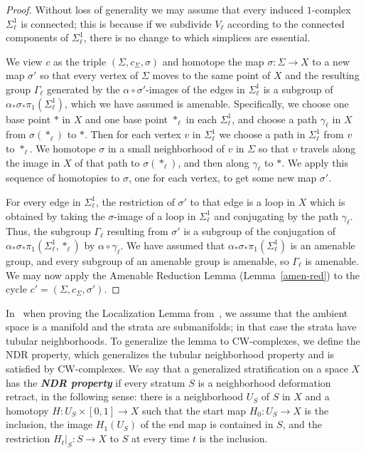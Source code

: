 \documentclass[psamsfonts]{amsart}
\theoremstyle{remark}
\begin{document}
\begin{proof}
Without loss of generality we may assume that every induced $1$-complex $\Sigma_\ell^1$ is connected; this is because if we subdivide $V_\ell$ according to the connected components of $\Sigma_\ell^1$, there is no change to which simplices are essential.  

We view $c$ as the triple $(\Sigma, c_\Sigma, \sigma)$ and homotope the map $\sigma : \Sigma \rightarrow X$ to a new map $\sigma'$ so that every vertex of $\Sigma$ moves to the same point of $X$ and the resulting group $\Gamma_\ell$ generated by the $\alpha \circ \sigma'$-images of the edges in $\Sigma_\ell^1$ is a subgroup of $\alpha_*\sigma_*\pi_1(\Sigma_\ell^1)$, which we have assumed is amenable.  Specifically, we choose one base point $*$ in $X$ and one base point $*_\ell$ in each $\Sigma_\ell^1$, and choose a path $\gamma_\ell$ in $X$ from $\sigma(*_\ell)$ to $*$.  Then for each vertex $v$ in $\Sigma_\ell^1$ we choose a path in $\Sigma_\ell^1$ from $v$ to $*_\ell$.  We homotope $\sigma$ in a small neighborhood of $v$ in $\Sigma$ so that $v$ travels along the image in $X$ of that path to $\sigma(*_\ell)$, and then along $\gamma_\ell$ to $*$.  We apply this sequence of homotopies to $\sigma$, one for each vertex, to get some new map $\sigma'$.

For every edge in $\Sigma_\ell^1$, the restriction of $\sigma'$ to that edge is a loop in $X$ which is obtained by taking the $\sigma$-image of a loop in $\Sigma_\ell^1$ and conjugating by the path $\gamma_\ell$.  Thus, the subgroup $\Gamma_\ell$ resulting from $\sigma'$ is a subgroup of the conjugation of $\alpha_*\sigma_*\pi_1(\Sigma_\ell^1, *_\ell)$ by $\alpha \circ \gamma_\ell$.  We have assumed that $\alpha_*\sigma_*\pi_1(\Sigma_\ell^1)$ is an amenable group, and every subgroup of an amenable group is amenable, so $\Gamma_\ell$ is amenable.  We may now apply the Amenable Reduction Lemma (Lemma~\ref{amen-red}) to the cycle $c' = (\Sigma, c_\Sigma, \sigma')$.

\end{proof}

In~\cite{Alpert15} when proving the Localization Lemma from~\cite{Gromov09}, we assume that the ambient space is a manifold and the strata are submanifolds; in that case the strata have tubular neighborhoods.  To generalize the lemma to CW-complexes, we define the NDR property, which generalizes the tubular neighborhood property and is satisfied by CW-complexes.  We say that a generalized stratification on a space $X$ has the \textbf{\emph{NDR property}} if every stratum $S$ is a neighborhood deformation retract, in the following sense: there is a neighborhood $U_S$ of $S$ in $X$ and a homotopy $H : U_S \times [0, 1] \rightarrow X$ such that the start map $H_0 : U_S \rightarrow X$ is the inclusion, the image $H_1(U_S)$ of the end map is contained in $S$, and the restriction $H_t\vert_S : S \rightarrow X$ to $S$ at every time $t$ is the inclusion.
\end{document}
